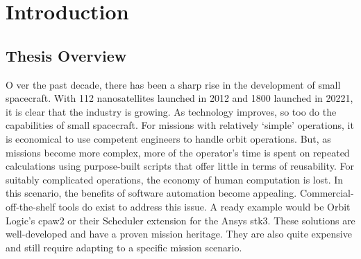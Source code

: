 \glsresetall{} 
\chapter{Introduction}\label{chap:intro}


\section{Thesis Overview}


\lettrine[lines=2, findent=0pt, nindent=5pt]{O}{} ver the past decade, there
has been a sharp rise in the development of small spacecraft. With 112
nanosatellites launched in 2012 and 1800 launched in 20221, it is clear that
the industry is growing. As technology improves, so too do the capabilities of
small spacecraft. For missions with relatively ‘simple’ operations, it is
economical to use competent engineers to handle orbit operations. But, as
missions become more complex, more of the operator’s time is spent on repeated
calculations using purpose-built scripts that offer little in terms of
reusability. For suitably complicated operations, the economy of human
computation is lost. In this scenario, the benefits of software automation
become appealing. Commercial-off-the-shelf tools do exist to address this
issue. A ready example would be Orbit Logic’s \gls{cpaw}2 or their Scheduler
extension for the Ansys \gls{stk}3. These solutions are well-developed and have
a proven mission heritage. They are also quite expensive and still require
adapting to a specific mission scenario.  \\ 


